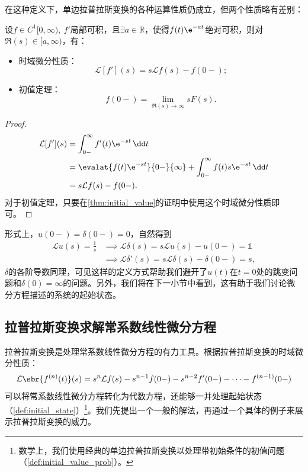 在这种定义下，单边拉普拉斯变换的各种运算性质仍成立，但两个性质略有差别：
\begin{proposition}[改进的拉普拉斯变换的性质]
    设$f\in C^1[0,\infty),\ f'$局部可积，且$\exists a\in\mathbb{R}$，使得$f(t)\e^{-at}$绝对可积，则对$\Re(s)\in[a,\infty)$，有：
    \begin{itemize}
        \item 时域微分性质：
        \begin{equation}
            \mathcal{L}[f'](s)=s\mathcal{L}f(s)-f(0-);
        \end{equation}
        \item 初值定理：
        \begin{equation}
            f(0-)=\lim_{\Re(s)\to\infty}sF(s).
        \end{equation}
    \end{itemize}
\end{proposition}
\begin{proof}
    \begin{align}
        \mathcal{L}[f'](s)&=\int_{0-}^{\infty}f'(t)\e^{-st}\,\dd t\nonumber\\
        &=\evalat{f(t)\e^{-st}}{0-}{\infty}+\int_{0-}^{\infty}f(t)s\e^{-st}\,\dd t\nonumber\\
        &=s\mathcal{L}f(s)-f(0-).
    \end{align}
    对于初值定理，只要在\cref{thm:initial_value}的证明中使用这个时域微分性质即可。
\end{proof}

形式上，$u(0-)=\delta(0-)=0$，自然得到
\begin{align}
    \mathcal{L}u(s)=\frac{1}{s}&\implies\mathcal{L}\delta(s)=s\mathcal{L}u(s)-u(0-)=\mathds{1}\nonumber\\
    &\implies\mathcal{L}\delta'(s)=s\mathcal{L}\delta(s)-\delta(0-)=s,
\end{align}
$\delta$的各阶导数同理，可见这样的定义方式帮助我们避开了$u(t)$在$t=0$处的跳变问题和$\delta(0)=\infty$的问题。另外，我们将在下一小节中看到，这有助于我们讨论微分方程描述的系统的起始状态。

\subsection{拉普拉斯变换求解常系数线性微分方程}\label{sub:laplace_ODE}
拉普拉斯变换是处理常系数线性微分方程的有力工具。根据拉普拉斯变换的时域微分性质：
\begin{equation}
    \mathcal{L}\sbr{f^{(n)}(t)}(s)=s^n\mathcal{L}f(s)-s^{n-1}f(0-)-s^{n-2}f'(0-)-\cdots-f^{(n-1)}(0-)
\end{equation}
可以将常系数线性微分方程转化为代数方程，还能够一并处理起始状态（\cref{def:initial_state}）\footnote{数学上，我们使用经典的单边拉普拉斯变换以处理带初始条件的初值问题（\cref{def:initial_value_prob}）。}。我们先提出一个一般的解法，再通过一个具体的例子来展示拉普拉斯变换的威力。

